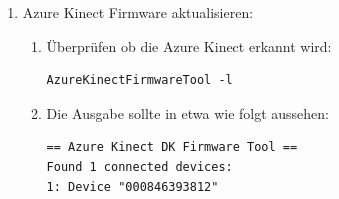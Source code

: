 \begin{enumerate}[label*=\arabic*.]
\begin{enumerate}[label*=\arabic*.]
                \begin{redbox}{Wichtig:}
                    Die jeweilige Development-Version von libk4a installieren!

                    \begin{lstlisting}[style=bash]
sudo apt install libk4a<major>.<minor>-dev
                    \end{lstlisting}

                    z.B.

                    \begin{lstlisting}[style=bash]
sudo apt install libk4a1.3-dev
                    \end{lstlisting}
                \end{redbox}

            \item Um Paketkollisionen beim Updaten zu verhindern sollten das Paket  vom Updateprozess ausgeschlossen werden:
                \begin{lstlisting}[style=bash]
sudo apt-mark hold k4a-tools
sudo apt-mark showhold
                \end{lstlisting}

            \item Nun kann das Paket  ohne Paketkollisionen installiert werden:
                \begin{lstlisting}[style=bash]
sudo apt install libk4abt1.0-dev
                \end{lstlisting}
        \end{enumerate}

    \item Azure Kinect Firmware aktualisieren:
        \begin{enumerate}[label*=\arabic*.]
            \item Überprüfen ob die Azure Kinect erkannt wird:
                \begin{lstlisting}[style=bash]
AzureKinectFirmwareTool -l
                \end{lstlisting}

            \item Die Ausgabe sollte in etwa wie folgt aussehen:
                \begin{lstlisting}[style=bash]
 == Azure Kinect DK Firmware Tool ==
Found 1 connected devices:
1: Device "000846393812"
                \end{lstlisting}


\end{enumerate}
\end{enumerate}

